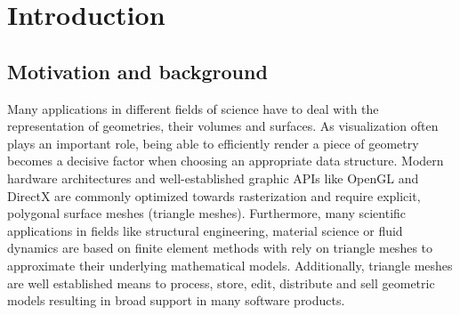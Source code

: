 \chapter{Introduction}
\label{ch:introduction}

\section{Motivation and background}
\label{ch:motivation}

Many applications in different fields of science have to deal with the representation of geometries, their volumes and surfaces.
As visualization often plays an important role, being able to efficiently render a piece of geometry becomes a decisive factor when choosing an appropriate data structure.
Modern hardware architectures and well-established graphic APIs like OpenGL and DirectX are commonly optimized towards rasterization and require explicit, polygonal surface meshes (\eg triangle meshes).
Furthermore, many scientific applications in fields like structural engineering, material science or fluid dynamics are based on finite element methods with rely on triangle meshes to approximate their underlying mathematical models.
Additionally, triangle meshes are well established means to process, store, edit, distribute and sell geometric models resulting in broad support in many software products.


